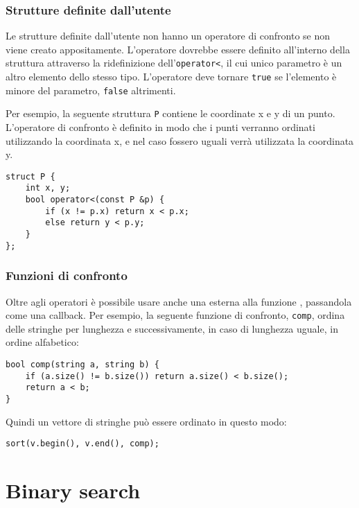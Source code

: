 \subsubsection{Strutture definite dall'utente}

Le strutture definite dall'utente non hanno
un operatore di confronto se non viene creato appositamente.
L'operatore dovrebbe essere definito all'interno 
della struttura attraverso la ridefinizione dell'\texttt{operator<},
il cui unico parametro è un altro elemento dello stesso tipo.
L'operatore deve tornare \texttt{true}
se l'elemento è minore del parametro,
\texttt{false} altrimenti.

Per esempio, la seguente struttura \texttt{P}
contiene le coordinate x e y di un punto.
L'operatore di confronto è definito in modo che i 
punti verranno ordinati utilizzando la coordinata x,
e nel caso fossero uguali verrà utilizzata la coordinata y.

\begin{lstlisting}
struct P {
    int x, y;
    bool operator<(const P &p) {
        if (x != p.x) return x < p.x;
        else return y < p.y;
    }
};
\end{lstlisting}

\subsubsection{Funzioni di confronto}


Oltre agli operatori è possibile usare anche una
 esterna
alla funzione , passandola come una callback. 
Per esempio, la seguente funzione di confronto, \texttt{comp},
ordina delle stringhe per lunghezza e successivamente, in caso di 
lunghezza uguale, in ordine alfabetico:

\begin{lstlisting}
bool comp(string a, string b) {
    if (a.size() != b.size()) return a.size() < b.size();
    return a < b;
}
\end{lstlisting}
Quindi un vettore di stringhe può essere ordinato 
in questo modo:
\begin{lstlisting}
sort(v.begin(), v.end(), comp);
\end{lstlisting}

\section{Binary search}

